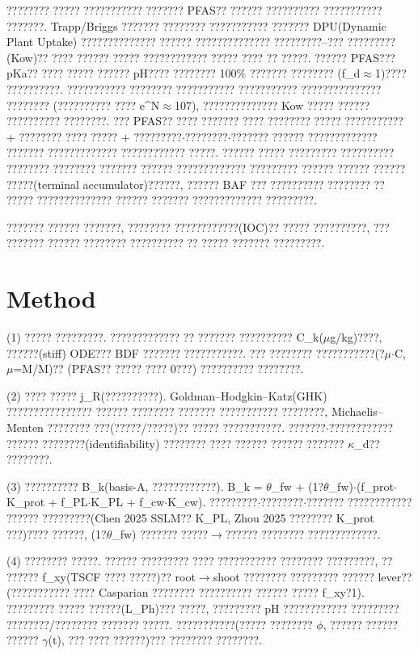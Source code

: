 \documentclass{article}
\begin{document}
???????? ????? ??????????? ??????? PFAS?? ?????? ?????????? ??????????? ???????. Trapp/Briggs
??????? ???????? ??????????? ??????? DPU(Dynamic Plant Uptake) ?????????????? ??????
?????????????? ?????????--??? ?????????(Kow)?? ???? ?????? ????? ???????????? ????? ???? ??
?????. ?????? PFAS??? pKa?? ???? ????? ?????? pH???? ???????? 100\% ??????? ????????
(f\_d$\approx$1)???? ??????????. ??????????? ???????? ??????????? ??????????? ??????????????? ????????
(?????????? ???? e\textasciicircum{}N$\approx$107), ?????????????? Kow ????? ?????? ?????????? ????????. ??? PFAS??
???? ??????? ???? ???????? ????? ??????????? + ???????? ???? ????? + ?????????$\cdot$????????$\cdot$???????
?????? ????????????? ??????? ????????????? ???????????? ?????. ?????? ????? ????????? ??????????
???????? ???????? ??????? ?????? ????????????? ????????? ?????? ?????? ?????? ?????(terminal
accumulator)??????, ?????? BAF ??? ?????????? ???????? ?? ????? ?????????????? ?????? ???????
????????????? ?????????.

??????? ?????? ???????, ???????? ????????????(IOC)?? ????? ??????????, ??? ??????? ?????? ????????
?????????? ?? ????? ??????? ?????????.

\section{Method}
(1) ????? ?????????. ????????????? ?? ??????? ?????????? C\_k($\mu$g/kg)????, ??????(stiff) ODE???
BDF ??????? ???????????. ??? ???????? ???????????(?$\mu$$\cdot$C, $\mu$=M/M)?? (PFAS?? ????? ???? 0???)
?????????? ????????.

(2) ???? ????? j\_R(??????????). Goldman--Hodgkin--Katz(GHK) ???????????????? ?????? ????????
??????? ??????????? ????????, Michaelis--Menten ???????? ???(?????/?????)?? ????? ???????????.
???????$\cdot$???????????? ?????? ????????(identifiability) ???????? ???? ?????? ?????? ??????? $\kappa$\_d??
????????.

(3) ?????????? B\_k(basis-A, ????????????). B\_k = $\theta$\_fw + (1?$\theta$\_fw)$\cdot$(f\_prot$\cdot$K\_prot +
f\_PL$\cdot$K\_PL + f\_cw$\cdot$K\_cw). ?????????$\cdot$????????$\cdot$??????? ???????????? ?????? ?????????(Chen 2025
SSLM?? K\_PL, Zhou 2025 ???????? K\_prot ???)???? ??????, (1?$\theta$\_fw) ??????? ?????$\rightarrow$??????
???????? ?????????????.

(4) ???????? ?????. ?????? ????????? ???? ??????????? ???????? ?????????, ?? ?????? f\_xy(TSCF
???? ?????)?? root$\rightarrow$shoot ???????? ????????? ?????? lever??(??????????? ???? Casparian
???????? ?????????? ?????? ????? f\_xy?1). ????????? ????? ??????(L\_Ph)??? ?????, ????????? pH
???????????? ????????? ????????/???????? ??????? ?????. ???????????(????? ???????? $\phi$, ?????? ??????
?????? $\gamma$(t), ??? ???? ??????)??? ???????? ????????.
\end{document}
